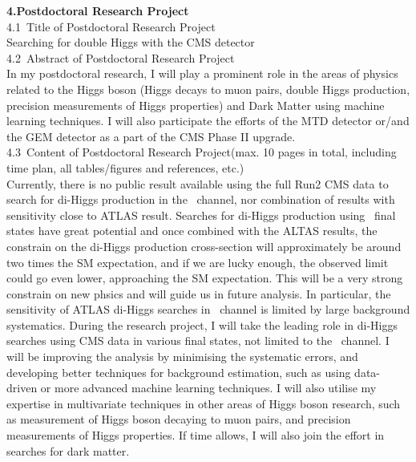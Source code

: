 \documentclass[twoside,11pt]{report}
\begin{document}
\Large{\textbf{4.Postdoctoral Research Project }}\\
\newline
\Large{4.1\ Title of Postdoctoral Research Project}\\
\newline
\normalsize
Searching for double Higgs with the CMS detector \\
\newline
\Large{4.2\ Abstract of Postdoctoral Research Project}\\
\newline
\normalsize
In my postdoctoral research, 
I will play a prominent role in the areas of physics related to the Higgs boson 
(Higgs decays to muon pairs, double Higgs production, precision measurements of Higgs properties) and 
Dark Matter using machine learning techniques.
I will also participate the efforts of the MTD detector or/and the GEM detector as a part of the CMS Phase II upgrade.\\
\newline
\Large{4.3\ Content of Postdoctoral Research Project(max. 10 pages in total, including time plan, all tables/figures and references, etc.)}\\
\newline
\normalsize
Currently, there is no public result available using the full Run2 CMS data to search for di-Higgs production
in the \bbtt\ channel, nor combination of results with sensitivity close to ATLAS result. 
Searches for di-Higgs production using \bbtt\ final states have great potential and once combined with the ALTAS results, 
the constrain on the di-Higgs production cross-section will approximately be around two times the SM expectation, 
and if we are lucky enough, the observed limit could go even lower, approaching the SM expectation. This will be a very strong 
constrain on new phsics and will guide us in future analysis. 
In particular, the sensitivity of ATLAS di-Higgs searches in \bbtt\ channel is limited by large background systematics.  
During the research project, I will take the leading role in di-Higgs searches using CMS data in various final
states, not limited to the \bbtt\ channel. I will be improving the analysis by minimising the systematic errors,
and developing better techniques for background estimation, such as using data-driven or more advanced machine learning
techniques.
I will also utilise my expertise in multivariate techniques in other areas
of Higgs boson research, such as measurement of Higgs boson decaying to muon pairs, and precision measurements
of Higgs properties. If time allows, I will also join the effort in searches for dark matter. 
\end{document}
